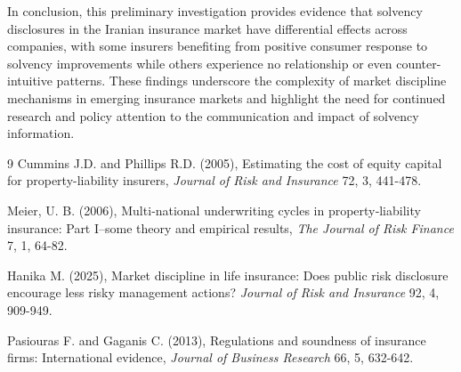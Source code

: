 \documentclass[twoside]{article}
\begin{document}
In conclusion, this preliminary investigation provides evidence that solvency disclosures in the Iranian insurance market have differential effects across companies, with some insurers benefiting from positive consumer response to solvency improvements while others experience no relationship or even counter-intuitive patterns. These findings underscore the complexity of market discipline mechanisms in emerging insurance markets and highlight the need for continued research and policy attention to the communication and impact of solvency information.




\begin{thebibliography}{9}
Cummins J.D. and Phillips R.D. (2005), Estimating the cost of equity capital for property-liability insurers, {\it Journal of Risk and Insurance} 72, 3, 441-478.

Meier, U. B. (2006), Multi‐national underwriting cycles in property‐liability insurance: Part I–some theory and empirical results, {\it The Journal of Risk Finance} 7, 1, 64-82.

Hanika M. (2025), Market discipline in life insurance: Does public risk disclosure encourage less risky management actions? {\it Journal of Risk and Insurance} 92, 4, 909-949.

Pasiouras F. and Gaganis C. (2013), Regulations and soundness of insurance firms: International evidence, {\it Journal of Business Research} 66, 5, 632-642.

\end{thebibliography}
 
\end{document}
